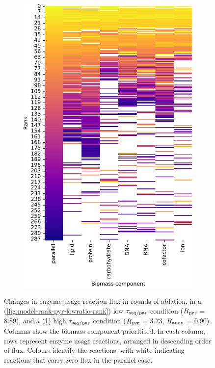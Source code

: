 \begin{figure}
  \begin{subfigure}[t]{0.45\textwidth}
  \centering
    \includegraphics[width=\linewidth]{CompareEnzUse_glc00p00_pyr03p73_amm00p90_1.pdf}
    \caption{
    }
    \label{fig:model-rank-pyr-highratio-rank}
  \end{subfigure}

  \caption{
    Changes in enzyme usage reaction flux in rounds of ablation, in a (\ref{fig:model-rank-pyr-lowratio-rank}) low $\tau_{\mathrm{seq}/\mathrm{par}}$ condition ($R_{\mathrm{pyr}}$ = \SI{8.89}{\mmolgdwh}), and a (\ref{fig:model-rank-pyr-highratio-rank}) high $\tau_{\mathrm{seq}/\mathrm{par}}$ condition ($R_{\mathrm{pyr}}$ = \SI{3.73}{\mmolgdwh}, $R_{\mathrm{amm}}$ = \SI{0.90}{\mmolgdwh}).
    Columns show the biomass component prioritised.
    In each column, rows represent enzyme usage reactions, arranged in descending order of flux.
    Colours identify the reactions, with white indicating reactions that carry zero flux in the parallel case.
  }
  \label{fig:model-rank-pyr-rank}
\end{figure}

